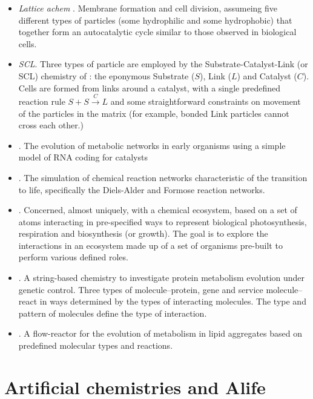 \begin{itemize}
\item
\emph{Lattice \gls{achem}} \parencite{Madina2003,Ono2000}. Membrane formation and cell division, assumeing five different types of particles (some hydrophilic and some hydrophobic) that together form an autocatalytic cycle similar to those observed in biological cells.
\item
\emph{SCL}. Three types of particle are employed by the Substrate-Catalyst-Link (or SCL) chemistry of \textcite{Varela:1974qd,Suzuki2008}: the eponymous Substrate ($S$), Link ($L$) and Catalyst ($C$). Cells are formed from links around a catalyst, with a single predefined reaction rule $S + S\xrightarrow{C} L$ and some straightforward constraints on movement of the particles in the matrix (for example, bonded Link particles cannot cross each other.)
\item
\emph{\Textcite{Flamm2010, Ullrich2010}}. The evolution of metabolic networks in early organisms using a simple model of RNA coding for catalysts
\item \emph{\Textcite{Hogerl2010}}. The simulation of chemical reaction networks characteristic of the transition to life, specifically the Diels-Alder and Formose reaction networks.
\item
\emph{\Textcite{Dorin:2006fk}}. Concerned, almost uniquely, with a chemical ecosystem, based on a set of atoms interacting in pre-specified ways to represent biological photosynthesis, respiration and biosynthesis (or growth). The goal is to explore the interactions in an ecosystem made up of a set of organisms pre-built to perform various defined roles.
\item
\emph{\Textcite{Gardiner2007}}. A string-based chemistry to investigate protein metabolism evolution under genetic control. Three types of molecule--protein, gene and service molecule--react in ways determined by the types of interacting molecules. The type and pattern of molecules define the type of interaction.
\item
\emph{\Textcite{Fernando:2008xy,Fernando:2007pf}}. A flow-reactor for the evolution of metabolism in lipid aggregates based on predefined molecular types and reactions.
\end{itemize}

\section{Artificial chemistries and Alife}\label{artificial-chemistries-and-alife}

